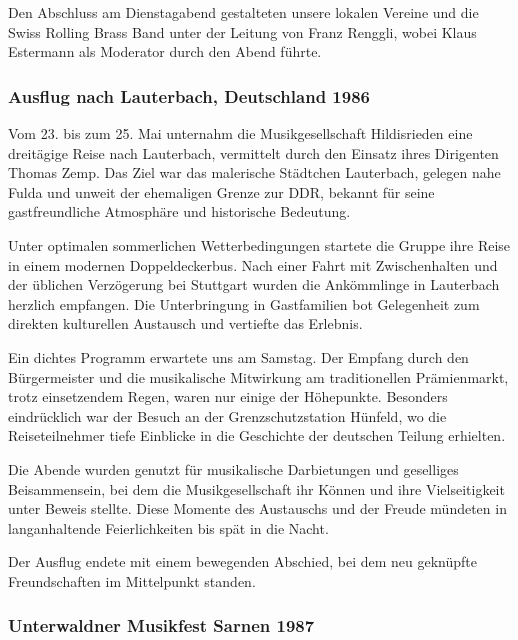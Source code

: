 \begin{history}

    Den Abschluss am Dienstagabend gestalteten unsere lokalen Vereine und die
    Swiss Rolling Brass Band unter der Leitung von Franz Renggli, wobei Klaus
    Estermann als Moderator durch den Abend führte.

    \subsubsection{Ausflug nach Lauterbach, Deutschland 1986}

    Vom 23. bis zum 25. Mai unternahm die Musikgesellschaft Hildisrieden eine
    dreitägige Reise nach Lauterbach, vermittelt durch den Einsatz ihres
    Dirigenten Thomas Zemp. Das Ziel war das malerische Städtchen Lauterbach,
    gelegen nahe Fulda und unweit der ehemaligen Grenze zur DDR, bekannt für
    seine gastfreundliche Atmosphäre und historische Bedeutung.

    Unter optimalen sommerlichen Wetterbedingungen startete die Gruppe ihre
    Reise in einem modernen Doppeldeckerbus. Nach einer Fahrt mit Zwischenhalten
    und der üblichen Verzögerung bei Stuttgart wurden die Ankömmlinge in
    Lauterbach herzlich empfangen. Die Unterbringung in Gastfamilien bot
    Gelegenheit zum direkten kulturellen Austausch und vertiefte das Erlebnis.

    Ein dichtes Programm erwartete uns am Samstag. Der Empfang durch den
    Bürgermeister und die musikalische Mitwirkung am traditionellen
    Prämienmarkt, trotz einsetzendem Regen, waren nur einige der Höhepunkte.
    Besonders eindrücklich war der Besuch an der Grenzschutzstation Hünfeld, wo
    die Reiseteilnehmer tiefe Einblicke in die Geschichte der deutschen Teilung
    erhielten.

    Die Abende wurden genutzt für musikalische Darbietungen und geselliges
    Beisammensein, bei dem die Musikgesellschaft ihr Können und ihre
    Vielseitigkeit unter Beweis stellte. Diese Momente des Austauschs und der
    Freude mündeten in langanhaltende Feierlichkeiten bis spät in die Nacht.

    Der Ausflug endete mit einem bewegenden Abschied, bei dem neu geknüpfte
    Freundschaften im Mittelpunkt standen.

    \subsubsection{Unterwaldner Musikfest Sarnen 1987}


\end{history}
